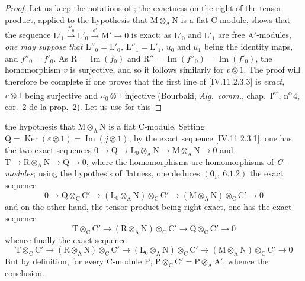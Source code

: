 \begin{proof}
Let us keep the notations of ; the exactness on the right of the tensor product, applied to the hypothesis that $\mathrm{M}\otimes_\mathrm{A}\mathrm{N}$ is a flat C-module, shows that the sequence $\mathrm{L}'_1\xrightarrow{f'_0}\mathrm{L}'_0\xrightarrow{\varepsilon'}\mathrm{M}'\to 0$ is exact; as $\mathrm{L}'_0$ and $\mathrm{L}'_1$ are free $\mathrm{A}'$-modules, \emph{one may suppose that $\mathrm{L}''_0=\mathrm{L}'_0$, $\mathrm{L}''_1=\mathrm{L}'_1$}, $u_0$ and $u_1$ being the identity maps, and $f''_0=f'_0$. As $\mathrm{R}=\operatorname{Im}(f_0)$ and $\mathrm{R}''=\operatorname{Im}(f''_0)=\operatorname{Im}(f'_0)$, the homomorphism $v$ is surjective, and so it follows similarly for $v\otimes 1$. The proof will therefore be complete if one proves that the first line of [IV.11.2.3.3] is \emph{exact}, $v\otimes 1$ being surjective and $u_0\otimes 1$ injective (Bourbaki, \emph{Alg.\ comm.}, chap.~I\textsuperscript{er}, n\textsuperscript{o}\,4, cor.~2 de la prop.~2). Let us use for this
\end{proof}


the hypothesis that $\mathrm{M}\otimes_\mathrm{A}\mathrm{N}$ is a flat C-module. Setting $\mathrm{Q}=\operatorname{Ker}(\varepsilon\otimes 1)=\operatorname{Im}(j\otimes 1)$, by the exact sequence [IV.11.2.3.1], one has the two exact sequences $0\to\mathrm{Q}\to\mathrm{L}_0\otimes_\mathrm{A}\mathrm{N}\to\mathrm{M}\otimes_\mathrm{A}\mathrm{N}\to 0$ and $\mathrm{T}\to\mathrm{R}\otimes_\mathrm{A}\mathrm{N}\to\mathrm{Q}\to 0$, where the homomorphisms are homomorphisms of \emph{C-modules}; using the hypothesis of flatness, one deduces $(\mathbf{0}_\mathrm{I},~6.1.2)$ the exact sequence
\[
  0\to\mathrm{Q}\otimes_\mathrm{C}\mathrm{C}'\to(\mathrm{L}_0\otimes_\mathrm{A}\mathrm{N})\otimes_\mathrm{C}\mathrm{C}'\to(\mathrm{M}\otimes_\mathrm{A}\mathrm{N})\otimes_\mathrm{C}\mathrm{C}'\to 0
\]
and on the other hand, the tensor product being right exact, one has the exact sequence
\[
  \mathrm{T}\otimes_\mathrm{C}\mathrm{C}'\to(\mathrm{R}\otimes_\mathrm{A}\mathrm{N})\otimes_\mathrm{C}\mathrm{C}'\to\mathrm{Q}\otimes_\mathrm{C}\mathrm{C}'\to 0
\]
whence finally the exact sequence
\[
  \mathrm{T}\otimes_\mathrm{C}\mathrm{C}'\to(\mathrm{R}\otimes_\mathrm{A}\mathrm{N})\otimes_\mathrm{C}\mathrm{C}'\to(\mathrm{L}_0\otimes_\mathrm{A}\mathrm{N})\otimes_\mathrm{C}\mathrm{C}'\to(\mathrm{M}\otimes_\mathrm{A}\mathrm{N})\otimes_\mathrm{C}\mathrm{C}'\to 0
\]
But by definition, for every C-module $\mathrm{P}$, $\mathrm{P}\otimes_\mathrm{C}\mathrm{C}'=\mathrm{P}\otimes_\mathrm{A}\mathrm{A}'$, whence the conclusion.

